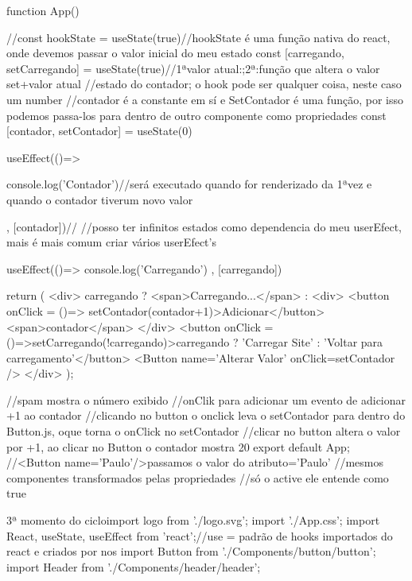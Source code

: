 function App() {
 
  //const hookState = useState(true)//hookState é uma função nativa do react, onde devemos passar o valor inicial do meu estado
  const [carregando, setCarregando] = useState(true)//1ªvalor atual:;2ª:função que altera o valor set+valor atual
  //estado do contador; o hook pode ser qualquer coisa, neste caso um number
  //contador é a constante em sí e SetContador é uma função, por isso podemos passa-los para dentro de outro componente como propriedades
  const [contador, setContador] = useState(0)

  useEffect(()=>{
    console.log('Contador')//será executado quando for renderizado da 1ªvez e quando o contador tiverum novo valor

  }, [contador])//
//posso ter infinitos estados como dependencia do meu userEfect, mais é mais comum criar vários userEfect's
  
  useEffect(()=>{ 
    console.log('Carregando')
  }, [carregando])

  return (
   <div>
    {carregando ? 
    <span>Carregando...</span> 
    :
    <div>
      <button onClick = {()=> setContador(contador+1)}>Adicionar</button>
      <span>{contador}</span>
    </div>
    }
    <button onClick = {()=>setCarregando(!carregando)}>{carregando ? 'Carregar Site' : 'Voltar para carregamento'}</button>
    <Button name='Alterar Valor' onClick={setContador} />
    </div>
  );
}
//spam mostra o número exibido
//onClik para adicionar um evento de adicionar +1 ao contador
//clicando no button o onclick leva o setContador para dentro do Button.js, oque torna o onClick no setContador
//clicar no button altera o valor por +1, ao clicar no Button o contador mostra 20 
export default App;
//<Button name='Paulo'/>passamos o valor do atributo='Paulo'
//mesmos componentes transformados pelas propriedades
//só o active ele entende como true

3ª momento do cicloimport logo from './logo.svg';
import './App.css';
import React, { useState, useEffect } from 'react';//use = padrão de hooks importados do react e criados por nos
import Button from './Components/button/button';
import Header from './Components/header/header';


